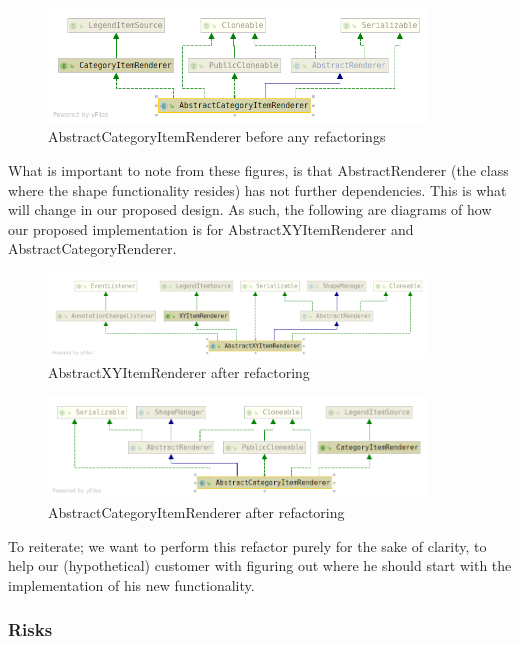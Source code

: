 \documentclass{article}
\begin{document}
\begin{figure}[H]
\centering
	\includegraphics[width=0.9\textwidth]{AbstractCategoryItemRendererBefore.png}
	\caption{AbstractCategoryItemRenderer before any refactorings}
\end{figure}

What is important to note from these figures, is that AbstractRenderer (the class where the shape functionality resides) has not further dependencies. This is what will change in our proposed design.
As such, the following are diagrams of how our proposed implementation is for AbstractXYItemRenderer and AbstractCategoryRenderer.

\begin{figure}[H]
\centering
	\includegraphics[width=0.9\textwidth]{AbstractXYItemRendererAfter.png}
	\caption{AbstractXYItemRenderer after refactoring}
\end{figure}

\begin{figure}[H]
\centering
	\includegraphics[width=0.9\textwidth]{AbstractCategoryItemRendererAfter.png}
	\caption{AbstractCategoryItemRenderer after refactoring}
\end{figure}

To reiterate; we want to perform this refactor purely for the sake of clarity, to help our (hypothetical) customer with figuring out where he should start with the implementation of his new functionality.

\subsubsection{Risks}
\end{document}
